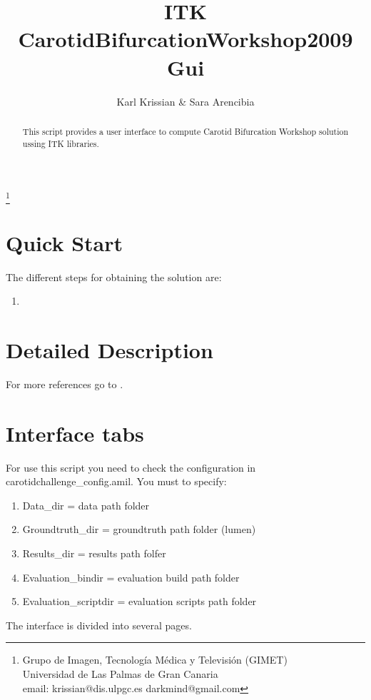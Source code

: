 \documentclass{article}
\begin{document}
\title{ITK CarotidBifurcationWorkshop2009 Gui}
\author{Karl Krissian \& Sara Arencibia}
\thanks{
Grupo de Imagen, Tecnolog\'ia M\'edica y Televisi\'on (GIMET)\\
Universidad de Las Palmas de Gran Canaria\\
email: krissian@dis.ulpgc.es darkmind@gmail.com
}


\maketitle

\begin{abstract}
This script provides a user interface to compute Carotid Bifurcation Workshop solution ussing ITK libraries.
\end{abstract}


\section{Quick Start}

The different steps for obtaining the solution are:
\begin{enumerate}
  \item
\end{enumerate}


\section{Detailed Description}
For more references go to \cite{IJ}.

\section{Interface tabs}
For use this script you need to check the configuration in carotidchallenge\_config.amil. You must to specify:
\begin{enumerate}
  \item Data\_dir = data path folder
  \item Groundtruth\_dir = groundtruth path folder (lumen)
  \item Results\_dir = results path folfer
  \item Evaluation\_bindir = evaluation build path folder
  \item Evaluation\_scriptdir = evaluation scripts path folder
\end{enumerate}

The interface is divided into several pages.
\end{document}
